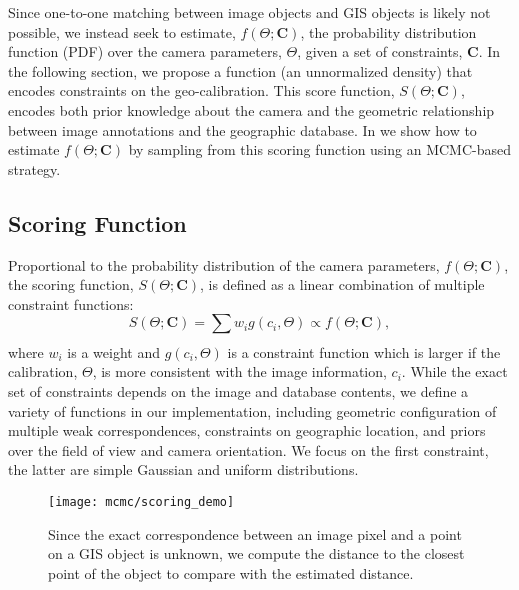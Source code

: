 Since one-to-one matching between image objects and GIS objects is
likely not possible, we instead seek to estimate, $f(\Theta;
\mathbf{C})$, the probability distribution function (PDF) over the
camera parameters, $\Theta$, given a set of constraints, $\mathbf{C}$.
In the following section, we propose a function (an unnormalized
density) that encodes constraints on the geo-calibration.  This score
function, $S(\Theta; \mathbf{C})$, encodes both prior knowledge about
the camera and the geometric relationship between image annotations
and the geographic database.
%
In  we show how to estimate $f(\Theta;\mathbf{C})$ by
sampling from this scoring function using an MCMC-based strategy.

\subsection{Scoring Function}
\label{sec:scoring-function}

Proportional to the probability distribution of the camera parameters,
$f(\Theta; \mathbf{C})$, the scoring function, $S(\Theta;
\mathbf{C})$, is defined as a linear combination of multiple constraint
functions:
%
\begin{equation}
  S(\Theta; \mathbf{C}) = \sum_{}{w_i g(c_i, \Theta)} \propto
  f(\Theta; \mathbf{C}),
\end{equation}
%
where $w_i$ is a weight and $g(c_i, \Theta)$ is a constraint function
which is larger if the calibration, $\Theta$, is more consistent with
the image information, $c_i$. While the exact set of constraints
depends on the image and database contents, we define a variety of
functions in our implementation, including geometric configuration of
multiple weak correspondences, constraints on geographic location, and
priors over the
%
field of view and camera orientation. We focus on the first
constraint, the latter are simple Gaussian and uniform distributions. 

\begin{figure}
\begin{minipage}[b]{1\linewidth}
  \centering
  \centerline{\texttt{[image: mcmc/scoring\_demo]}}
\end{minipage}
\caption{Since the exact correspondence between an image pixel and a point
  on a GIS object is unknown, we compute the distance to the closest
  point of the object to compare with the estimated distance.}
\label{fig:scoring-demo}
\end{figure}

